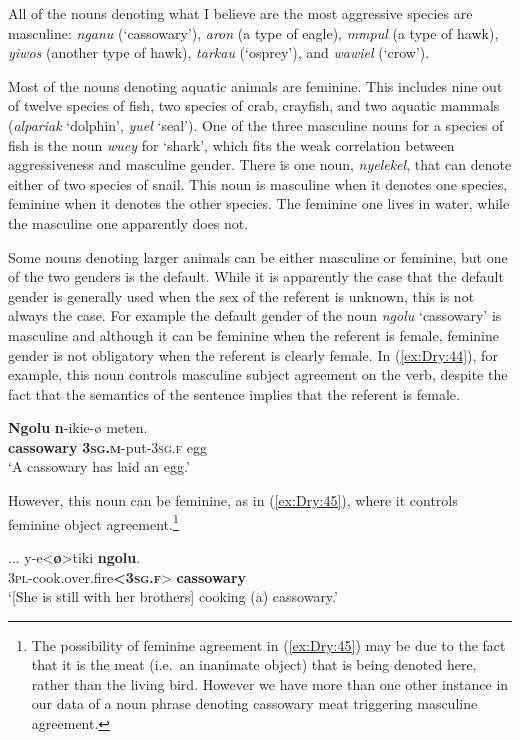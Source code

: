 \documentclass[output=collectionpaper]{langsci/langscibook}
\begin{document}
All of the nouns denoting what I believe are the most aggressive species are masculine: \textit{nganu} (`cassowary'), \textit{aron} (a type of eagle), \textit{mmpul} (a type of hawk), \textit{yiwos} (another type of hawk), \textit{tarkau} (`osprey'), and \textit{wawiel} (`crow').

Most of the nouns denoting aquatic animals are feminine. This includes nine out of twelve species of fish, two species of crab, crayfish, and two aquatic mammals (\textit{alpariak} `dolphin', \textit{yuel} `seal'). One of the three masculine nouns for a species of fish is the noun \textit{wuey} for `shark', which fits the weak correlation between aggressiveness and masculine gender. There is one noun, \textit{nyelekel}, that can denote either of two species of snail. This noun is masculine when it denotes one species, feminine when it denotes the other species. The feminine one lives in water, while the masculine one apparently does not.

Some nouns denoting larger animals can be either masculine or feminine, but one of the two genders is the default. While it is apparently the case that the default gender is generally used when the sex of the referent is unknown, this is not always the case. For example the default gender of the noun \textit{ngolu} `cassowary' is masculine and although it can be feminine when the referent is female, feminine gender is not obligatory when the referent is clearly female. In (\ref{ex:Dry:44}), for example, this noun controls masculine subject agreement on the verb, despite the fact that the semantics of the sentence implies that the referent is female.

\ea \label{ex:Dry:44}
\gll \textbf{Ngolu}	\textbf{n}-ikie-ø	meten.\\
\textbf{cassowary} \textbf{\textsc{3sg.m}}-put-\textsc{3sg.f} egg\\
\glt `A cassowary has laid an egg.'
\z

However, this noun can be feminine, as in (\ref{ex:Dry:45}), where it controls feminine object agreement.\footnote{The possibility of feminine agreement in (\ref{ex:Dry:45}) may be due to the fact that it is the meat (i.e.\ an inanimate object) that is being denoted here, rather than the living bird. However we have more than one other instance in our data of a noun phrase denoting cassowary meat triggering masculine agreement.}

\ea \label{ex:Dry:45}
\gll ...	y-e<\textbf{ø}>tiki	\textbf{ngolu}.\\
{} \textsc{3pl}-cook.over.fire\textbf{<\textsc{3sg.f}}> \textbf{cassowary}\\
\glt `[She is still with her brothers] cooking (a) cassowary.'
\z
\end{document}
